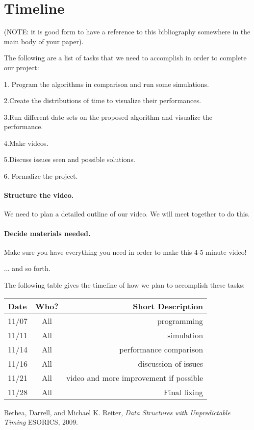 \documentclass[11pt,twocolumn]{article}
\begin{document}

 

\newpage
\onecolumn
\appendix
\section{Timeline}
(NOTE: it is good form to have a reference to this bibliography somewhere in 
the main body of your paper).

The following are a list of tasks that we need to accomplish in order to 
complete our project:

1. Program the algorithms in comparison and run some simulations.

2.Create the distributions of time to visualize their performances.

3.Run different date sets on the proposed algorithm and visualize the performance.

4.Make videos.

5.Discuss issues seen and possible solutions.

6. Formalize the project.

\paragraph{Structure the video.} We need to plan a detailed outline of our 
video.  We will meet together to do this.

\paragraph{Decide materials needed.}  Make sure you have everything you need in 
order to make this 4-5 minute video!

... and so forth.

The following table gives the timeline of how we plan to accomplish these tasks:

\begin{table}[h!]
\centering
\begin{tabular}{ |l | c | r|}
  \hline
  Date & Who? & Short Description \\
  \hline
  \hline
  11/07 & All & programming \\
  \hline
  11/11 & All & simulation \\
  
  \hline
  11/14 & All & performance comparison \\
  
  \hline
  11/16 & All & discussion of issues \\
  
  \hline
  11/21 & All & video and more improvement if possible \\
  
 
  \hline
  11/28 & All & Final fixing \\
  \hline
\end{tabular}
\end{table}

\pagebreak

\begin{thebibliography}{9}
	
	Bethea, Darrell, and Michael K. Reiter,
	\emph{Data Structures with Unpredictable Timing}
	ESORICS,
	2009.
	
\end{thebibliography}
\end{document}
